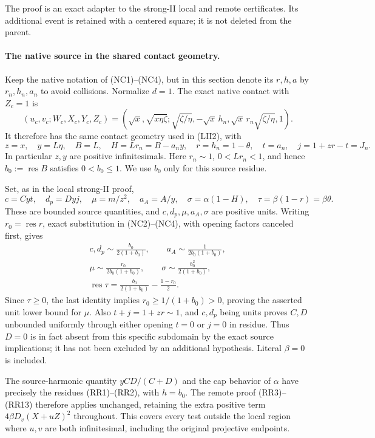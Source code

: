 The proof is an exact adapter to the strong-II local and remote
certificates.  Its additional event is retained with a centered
square; it is not deleted from the parent.

\paragraph{The native source in the shared contact geometry.}
Keep the native notation of (NC1)--(NC4), but in this section denote
its $r,h,a$ by $r_n,h_n,a_n$ to avoid collisions.  Normalize $d=1$.
The exact native contact with $Z_c=1$ is
\[
 (u_c,v_c;W_c,X_c,Y_c,Z_c)
 =\left(\sqrt x,\sqrt{x\eta\zeta};
 \sqrt{\zeta/\eta},-\sqrt x\,h_n,
 \sqrt x\,r_n\sqrt{\zeta/\eta},1\right).
\]
It therefore has the same contact geometry used in (LII2), with
\[
 z=x,\quad y=L\eta,\quad B=L,\quad H=Lr_n=B-a_ny,
 \quad r=h_n=1-\theta,\quad t=a_n,\quad
 j=1+zr-t=J_n.                                           \tag{LC1}
\]
In particular $z,y$ are positive infinitesimals.  Here $r_n\sim1$,
$0<Lr_n<1$, and hence $b_0:=\operatorname{res}B$ satisfies
$0<b_0\le1$.  We use $b_0$ only for this source residue.

Set, as in the local strong-II proof,
\[
 c=Cyt,\quad d_p=Dyj,\quad
 \mu=m/z^2,\quad a_A=A/y,\quad
 \sigma=\alpha(1-H),\quad \tau=\beta(1-r)=\beta\theta.
\]
These are bounded source quantities, and $c,d_p,\mu,a_A,\sigma$
are positive units.  Writing $r_0=\operatorname{res}r$, exact
substitution in (NC2)--(NC4), with opening factors canceled first,
gives
\[
\begin{gathered}
 c,d_p\sim\frac{b_0}{2(1+b_0)},\qquad
 a_A\sim\frac1{2b_0(1+b_0)},\\
 \mu\sim\frac{r_0}{2b_0(1+b_0)},\qquad
 \sigma\sim\frac{b_0^2}{2(1+b_0)},\\
 \operatorname{res}\tau=
 \frac{b_0}{2(1+b_0)}-\frac{1-r_0}{2}.                    
\end{gathered}
\tag{LC2}
\]
Since $\tau\ge0$, the last identity implies
$r_0\ge1/(1+b_0)>0$, proving the asserted unit lower bound for
$\mu$.  Also $t+j=1+zr\sim1$, and $c,d_p$ being units proves
$C,D$ unbounded uniformly through either opening $t=0$ or $j=0$
in residue.  Thus $D=0$ is in fact absent from this specific
subdomain by the exact source implications; it has not been excluded
by an additional hypothesis.  Literal $\beta=0$ is included.

The source-harmonic quantity $yCD/(C+D)$ and the cap behavior of
$\alpha$ have precisely the residues (RR1)--(RR2), with
$h=b_0$.  The remote proof (RR3)--(RR13) therefore applies unchanged,
retaining the extra positive term
$4\beta D_v(X+uZ)^2$ throughout.  This covers every test outside
the local region where $u,v$ are both infinitesimal, including the
original projective endpoints.

